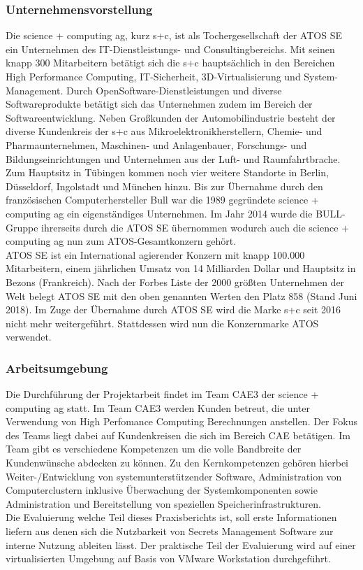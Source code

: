 \documentclass[
book,
a4paper,   
titlepage,  
halfparskip,
12pt        
]{scrartcl}
\begin{document}
\begin{onehalfspacing}
\subsubsection{Unternehmensvorstellung}
Die science + computing ag, kurz s+c, ist als Tochergesellschaft der ATOS SE ein Unternehmen des \ac{IT}-Dienstleistungs- und Consultingbereichs. Mit seinen knapp 300 Mitarbeitern betätigt sich die s+c hauptsächlich in den Bereichen High Performance Computing, \ac{IT}-Sicherheit, 3D-Virtualisierung und System-Management. Durch OpenSoftware-Dienstleistungen und diverse Softwareprodukte betätigt sich das Unternehmen zudem im Bereich der Softwareentwicklung. Neben Großkunden der Automobilindustrie besteht der diverse Kundenkreis der s+c aus Mikroelektronikherstellern, Chemie- und Pharmaunternehmen, Maschinen- und Anlagenbauer, Forschungs- und Bildungseinrichtungen und Unternehmen aus der Luft- und Raumfahrtbrache.\\
Zum Hauptsitz in Tübingen kommen noch vier weitere Standorte in Berlin, Düsseldorf, Ingolstadt und München hinzu. Bis zur Übernahme durch den französischen Computerhersteller Bull war die 1989 gegründete science + computing ag ein eigenständiges Unternehmen.\cite{bull} Im Jahr 2014 wurde die BULL-Gruppe ihrerseits durch die ATOS SE übernommen wodurch auch die science + computing ag nun zum ATOS-Gesamtkonzern gehört.\cite{atos}\\
ATOS SE ist ein International agierender Konzern mit knapp 100.000 Mitarbeitern, einem jährlichen Umsatz von 14 Milliarden Dollar und Hauptsitz in Bezons (Frankreich). Nach der Forbes Liste der 2000 größten Unternehmen der Welt belegt ATOS SE mit den oben genannten Werten den Platz 858 (Stand Juni 2018).\cite{forbes} Im Zuge der Übernahme durch ATOS SE wird die Marke s+c seit 2016 nicht mehr weitergeführt. Stattdessen wird nun die Konzernmarke ATOS verwendet.

\subsubsection{Arbeitsumgebung}
Die Durchführung der Projektarbeit findet im Team \ac{CAE}3 der science + computing ag statt. Im Team \ac{CAE}3 werden Kunden betreut, die unter Verwendung von High Perfomance Computing Berechnungen anstellen. Der Fokus des Teams liegt dabei auf Kundenkreisen die sich im Bereich \ac{CAE} betätigen. Im Team gibt es verschiedene Kompetenzen um die volle Bandbreite der Kundenwünsche abdecken zu können. Zu den Kernkompetenzen gehören hierbei Weiter-/Entwicklung von systemunterstützender Software, Administration von Computerclustern inklusive Überwachung der Systemkomponenten sowie Administration und Bereitstellung von speziellen Speicherinfrastrukturen.\\
Die Evaluierung welche Teil dieses Praxisberichts ist, soll erste Informationen liefern aus denen sich die Nutzbarkeit von Secrets Management Software zur interne Nutzung ableiten lässt. Der praktische Teil der Evaluierung wird auf einer virtualisierten Umgebung auf Basis von VMware Workstation durchgeführt.
                                                                                                                         

\end{onehalfspacing}
\end{document}
